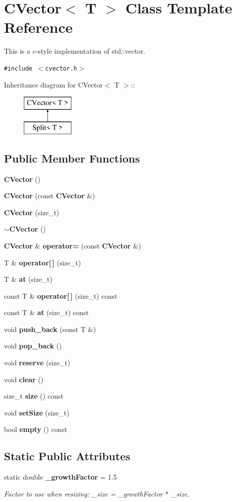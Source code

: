 \section{CVector$<$ T $>$ Class Template Reference}
\label{classCVector}
This is a c-style implementation of std::vector.  


{\tt \#include $<$cvector.h$>$}

Inheritance diagram for CVector$<$ T $>$::\begin{figure}[H]
\begin{center}
\leavevmode
\includegraphics[height=2cm]{classCVector}
\end{center}
\end{figure}
\subsection*{Public Member Functions}
\begin{CompactItemize}
\item 
{\bf CVector} ()
\item 
{\bf CVector} (const {\bf CVector} \&)
\item 
{\bf CVector} (size\_\-t)
\item 
{\bf $\sim$CVector} ()
\item 
{\bf CVector} \& {\bf operator=} (const {\bf CVector} \&)
\item 
T \& {\bf operator[$\,$]} (size\_\-t)
\item 
T \& {\bf at} (size\_\-t)
\item 
const T \& {\bf operator[$\,$]} (size\_\-t) const 
\item 
const T \& {\bf at} (size\_\-t) const 
\item 
void {\bf push\_\-back} (const T \&)
\item 
void {\bf pop\_\-back} ()
\item 
void {\bf reserve} (size\_\-t)
\item 
void {\bf clear} ()
\item 
size\_\-t {\bf size} () const 
\item 
void {\bf set\-Size} (size\_\-t)
\item 
bool {\bf empty} () const 
\end{CompactItemize}
\subsection*{Static Public Attributes}
\begin{CompactItemize}
\item 
static double {\bf \_\-growth\-Factor} = 1.5
\begin{CompactList}\small\item\em Factor to use when resizing: \_\-size = \_\-growth\-Factor $\ast$ \_\-size. \item\end{CompactList}\end{CompactItemize}
